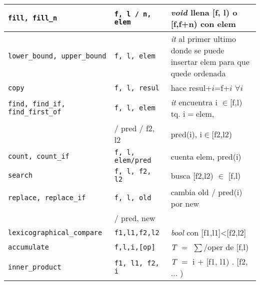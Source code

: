 \begin{center}
\footnotesize
{
  \begin{xtabular}{|L{.4\columnwidth}|C{.22\columnwidth}|L{.4\columnwidth}|}
  \texttt{fill, fill\_n}  & \texttt{f, l / n, elem}         & \textit{void} llena [f, l) o [f,f+n) con elem                                                        \\ \hline
  \texttt{lower\_bound, upper\_bound}  & \texttt{f, l, elem}     & \textit{it} al primer ultimo donde se puede insertar elem para que quede ordenada                                                                         \\ \hline
  \texttt{copy}  & \texttt{f, l, resul}       & hace resul+$i$=f+$i$ $\forall i$                                                         \\ \hline
  \texttt{find, find\_if, find\_first\_of}       & \texttt{f, l, elem}               & \textit{it} encuentra i $\in$[f,l) tq. i$=$elem, \\ & / pred / f2, l2 & pred(i), i$\in$[f2,l2)                                            \\ \hline
  \texttt{count, count\_if}       & \texttt{f, l, elem/pred}               & cuenta elem, pred(i)                                                                 \\ \hline
  \texttt{search}        & \texttt{f, l, f2, l2}           & busca [f2,l2) $\in$ [f,l)            \\ \hline
  \texttt{replace, replace\_if}       & \texttt{f, l, old}               & cambia old / pred(i) por new \\ & / pred, new                                   \\ \hline
  \texttt{lexicographical\_compare}        & \texttt{f1,l1,f2,l2}          & \textit{bool} con [f1,l1]<[f2,l2]                                                 \\ \hline
  \texttt{accumulate} & \texttt{f,l,i,[op]} & \textit{T} $=$ $\sum$/oper de [f,l)\\\hline
  \texttt{inner\_product} & \texttt{f1, l1, f2, i} & \textit{T} $=$ i $+$ [f1, l1) . [f2, $\ldots$ )\\\hline

\end{xtabular}}
\end{center}
